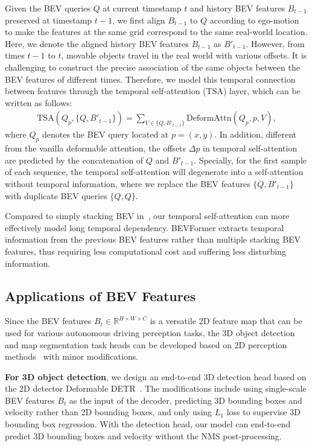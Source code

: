\documentclass{article}
\begin{document}
Given the BEV queries $Q$ at current timestamp $t$ and history BEV features $B_{t\!-\!1}$ preserved at timestamp $t\!-\!1$, we first align $B_{t\!-\!1}$ to $Q$ according to ego-motion to make the features at the same grid correspond to the same real-world location. 
Here, we denote the aligned history BEV features $B_{t\!-\!1}$ as $B'_{t\!-\!1}$. However, from times $t-1$ to $t$, movable objects travel in the real world with various offsets. It is challenging to construct the precise association of the same objects between the BEV features of different times. 
Therefore, we model this temporal connection between features through the temporal self-attention (TSA) layer, which can be written as follows:
\begin{align}\label{MSDeformAttn}
    \text{TSA}(Q_p, \{Q, B'_{t-1}\}) = 
    \sum_{V\in \{Q, B'_{t-1}\}} \text{DeformAttn}(Q_p, p, V),
\end{align}
where $Q_p$ denotes the BEV query located at $p=(x, y)$. In addition, different from the vanilla deformable attention, the offsets $\Delta p$ in temporal self-attention are predicted by the concatenation of $Q$ and $B'_{t-1}$.
Specially, for the first sample of each sequence, the temporal self-attention will degenerate into a self-attention without temporal information, where we replace the BEV features $\{Q, B'_{t-1}\}$ with duplicate BEV queries $\{Q, Q\}$. 


Compared to simply stacking BEV in~\cite{hu2021fiery,saha2021translating,can2020understanding}, our temporal self-attention can more effectively model long temporal dependency. BEVFormer extracts temporal information from the previous BEV features rather than multiple stacking BEV features, thus requiring less computational cost and suffering less disturbing information.




    


\subsection{Applications of BEV Features}
Since the BEV features $B_t\in \mathbb{R}^{H\times W \times C}$  is a versatile 2D feature map that can be used for various autonomous driving perception tasks, the 3D object detection and map segmentation task heads can be developed based on 2D perception methods~\cite{zhu2020deformable,li2021panoptic} with minor modifications. 

\noindent\textbf{For 3D object detection}, we design an end-to-end 3D detection head based on the 2D detector Deformable DETR~\cite{zhu2020deformable}. The modifications include using single-scale BEV features $B_t$ as the input of the decoder, predicting 3D bounding boxes and velocity rather than 2D bounding boxes, and only using $L_1$ loss
to supervise 3D bounding box regression. With the detection head, our model can end-to-end predict 3D bounding boxes and velocity without the NMS post-processing.
\end{document}

